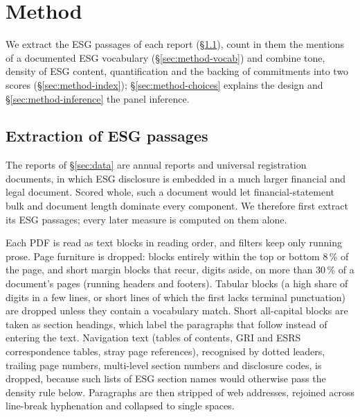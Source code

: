 \section{Method}
\label{sec:method}

We extract the ESG passages of each report (\S\ref{sec:method-extraction}),
count in them the mentions of a documented ESG vocabulary
(\S\ref{sec:method-vocab}) and combine tone, density of ESG content, quantification and the
backing of commitments into two scores (\S\ref{sec:method-index}); \S\ref{sec:method-choices}
explains the design and \S\ref{sec:method-inference} the panel inference.

\subsection{Extraction of ESG passages}
\label{sec:method-extraction}

The reports of \S\ref{sec:data} are annual reports and universal registration
documents, in which ESG disclosure is embedded in a much larger financial and
legal document. Scored whole, such a document would let financial-statement
bulk and document length dominate every component. We therefore first extract
its ESG passages; every later measure is computed on them alone.

Each PDF is read as text blocks in reading order, and filters keep only running
prose. Page furniture is dropped: blocks entirely within the top or bottom
8\,\% of the page, and short margin blocks that recur, digits aside, on more
than 30\,\% of a document's pages (running headers and footers). Tabular blocks
(a high share of digits in a few lines, or short lines of which the first lacks
terminal punctuation) are dropped unless they contain a vocabulary match. Short
all-capital blocks are taken as section headings, which label the paragraphs
that follow instead of entering the text. Navigation text (tables of contents,
GRI and ESRS correspondence tables, stray page references), recognised by
dotted leaders, trailing page numbers, multi-level section numbers and
disclosure codes, is dropped, because such lists of ESG section names would
otherwise pass the density rule below. Paragraphs are then stripped of web
addresses, rejoined across line-break hyphenation and collapsed to single
spaces.

